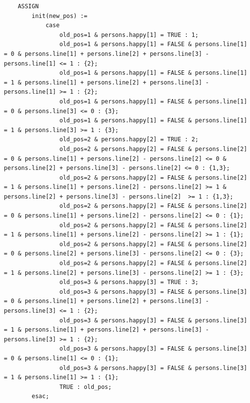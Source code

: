 \documentclass[twoside,openright]{article}
\begin{document}
\begin{appendices}
\begin{lstlisting}
	ASSIGN
		init(new_pos) :=
			case
				old_pos=1 & persons.happy[1] = TRUE : 1;
				old_pos=1 & persons.happy[1] = FALSE & persons.line[1] = 0 & persons.line[1] + persons.line[2] + persons.line[3] - persons.line[1] <= 1 : {2};
				old_pos=1 & persons.happy[1] = FALSE & persons.line[1] = 1 & persons.line[1] + persons.line[2] + persons.line[3] - persons.line[1] >= 1 : {2};
				old_pos=1 & persons.happy[1] = FALSE & persons.line[1] = 0 & persons.line[3] <= 0 : {3};
				old_pos=1 & persons.happy[1] = FALSE & persons.line[1] = 1 & persons.line[3] >= 1 : {3};
				old_pos=2 & persons.happy[2] = TRUE : 2;
				old_pos=2 & persons.happy[2] = FALSE & persons.line[2] = 0 & persons.line[1] + persons.line[2] - persons.line[2] <= 0 & persons.line[2] + persons.line[3] - persons.line[2] <= 0 : {1,3};
				old_pos=2 & persons.happy[2] = FALSE & persons.line[2] = 1 & persons.line[1] + persons.line[2] - persons.line[2] >= 1 & persons.line[2] + persons.line[3] - persons.line[2]  >= 1 : {1,3};
				old_pos=2 & persons.happy[2] = FALSE & persons.line[2] = 0 & persons.line[1] + persons.line[2] - persons.line[2] <= 0 : {1};
				old_pos=2 & persons.happy[2] = FALSE & persons.line[2] = 1 & persons.line[1] + persons.line[2] - persons.line[2] >= 1 : {1};
				old_pos=2 & persons.happy[2] = FALSE & persons.line[2] = 0 & persons.line[2] + persons.line[3] - persons.line[2] <= 0 : {3};
				old_pos=2 & persons.happy[2] = FALSE & persons.line[2] = 1 & persons.line[2] + persons.line[3] - persons.line[2] >= 1 : {3};
				old_pos=3 & persons.happy[3] = TRUE : 3;
				old_pos=3 & persons.happy[3] = FALSE & persons.line[3] = 0 & persons.line[1] + persons.line[2] + persons.line[3] - persons.line[3] <= 1 : {2};
				old_pos=3 & persons.happy[3] = FALSE & persons.line[3] = 1 & persons.line[1] + persons.line[2] + persons.line[3] - persons.line[3] >= 1 : {2};
				old_pos=3 & persons.happy[3] = FALSE & persons.line[3] = 0 & persons.line[1] <= 0 : {1};
				old_pos=3 & persons.happy[3] = FALSE & persons.line[3] = 1 & persons.line[1] >= 1 : {1};
				TRUE : old_pos;
		esac;


\end{lstlisting}
\end{appendices}
\end{document}
